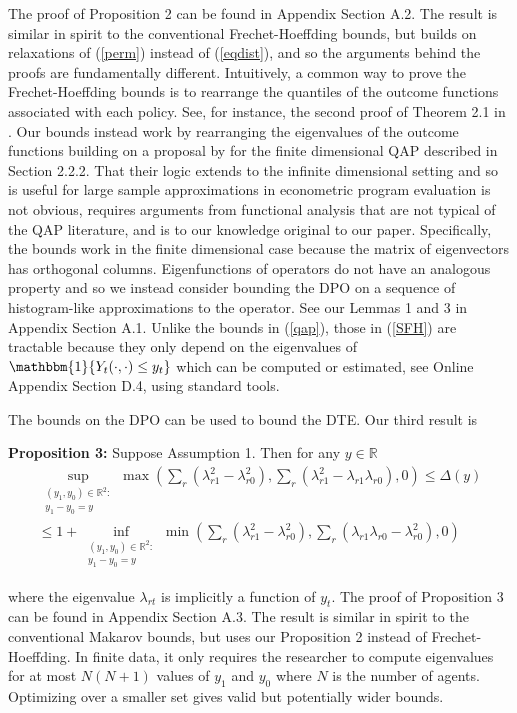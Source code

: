 \documentclass[12pt]{article}
\theoremstyle{definition}
\begin{document}
The proof of Proposition 2 can be found in Appendix Section A.2. The result is similar in spirit to the conventional Frechet-Hoeffding bounds, but builds on relaxations of (\ref{perm}) instead of (\ref{eqdist}), and so the arguments behind the proofs are fundamentally different. Intuitively, a common way to prove the Frechet-Hoeffding bounds is to rearrange the quantiles of the outcome functions associated with each policy. See, for instance, the second proof of Theorem 2.1 in \cite{whitt1976bivariate}. Our bounds instead work by rearranging the eigenvalues of the outcome functions building on a proposal by \cite{finke1987quadratic} for the finite dimensional QAP described in Section 2.2.2. That their logic extends to the infinite dimensional setting and so is useful for large sample approximations in  econometric program evaluation is  not obvious, requires arguments from functional analysis that are not typical of the QAP literature, and is  to our knowledge original to our paper. Specifically, the \cite{finke1987quadratic} bounds work in the finite dimensional case because the matrix of eigenvectors has orthogonal columns. Eigenfunctions of operators do not have an analogous property and so we instead consider bounding the DPO on a sequence of histogram-like approximations to the operator. See our Lemmas 1 and 3 in Appendix Section A.1. Unlike the bounds in  (\ref{qap}), those in  (\ref{SFH}) are tractable because they only depend on the eigenvalues of $\mathbbm{1}\{Y_{t}(\cdot,\cdot) \leq y_{t}\}$ which can be computed or estimated, see Online Appendix Section D.4, using standard tools.   

The bounds on the DPO can be used to bound the DTE. Our third result is
\begin{flushleft}
\textbf{Proposition 3:} Suppose Assumption 1. Then for any $y \in \mathbb{R}$
\begin{align}\label{SM}
\sup_{\substack{(y_{1},y_{0}) \in \mathbb{R}^{2}:\\ y_{1}-y_{0} = y}}\max\left(\sum_{r}\left(\lambda_{r1}^{2} - \lambda_{r0}^{2}\right),\sum_{r}\left(\lambda_{r1}^{2}-\lambda_{r1}\lambda_{r0}\right),0\right)
\leq \Delta(y) \nonumber \\
\leq 1 + \inf_{\substack{(y_{1},y_{0}) \in \mathbb{R}^{2}:\\ y_{1}-y_{0} = y}}\min\left(\sum_{r}\left(\lambda_{r1}^{2} - \lambda_{r0}^{2}\right),\sum_{r}\left(\lambda_{r1}\lambda_{r0}- \lambda_{r0}^{2}\right),0\right)
\end{align}
\end{flushleft}
where the eigenvalue $\lambda_{rt}$ is implicitly a function of $y_{t}$. The proof of Proposition 3 can be found in Appendix Section A.3. The result is similar in spirit to the conventional Makarov bounds, but uses our Proposition 2 instead of Frechet-Hoeffding. In finite data, it only requires the researcher to compute eigenvalues for at most $N(N+1)$ values of $y_{1}$ and $y_{0}$ where $N$ is the number of  agents. Optimizing over a smaller set gives valid but potentially wider bounds.   
\end{document}
